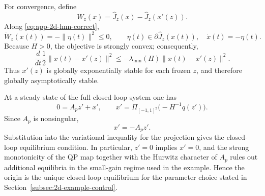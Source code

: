 \documentclass[journal]{IEEEtran}
\theoremstyle{myplain}
\begin{document}
For convergence, define
\[
  W_z(x)=\widehat J_z(x)-\widehat J_z(x'(z)).
\]
Along \eqref{eq:app-2d-hnn-correct},
\[
  \dot W_z(x(t))=-\|\eta(t)\|^2\le 0,
  \qquad
  \eta(t)\in\partial\widehat J_z(x(t)),\quad
  \dot x(t)=-\eta(t).
\]
Because \(H>0\), the objective is strongly convex; consequently,
\[
  \frac{d}{dt}\frac12\|x(t)-x'(z)\|^2
  \le
  -\lambda_{\min}(H)\|x(t)-x'(z)\|^2 .
\]
Thus \(x'(z)\) is globally exponentially stable for each frozen \(z\), and
therefore globally asymptotically stable.

At a steady state of the full closed-loop system one has
\[
  0=A_pz'+x',
  \qquad
  x'=\Pi_{[-1,1]^2}\bigl(-H^{-1}q(z')\bigr).
\]
Since \(A_p\) is nonsingular,
\[
  x'=-A_pz'.
\]
Substitution into the variational inequality for the projection gives the
closed-loop equilibrium condition. In particular, \(z'=0\) implies \(x'=0\),
and the strong monotonicity of the QP map together with the Hurwitz character
of \(A_p\) rules out additional equilibria in the small-gain regime used in the
example. Hence the origin is the unique closed-loop equilibrium for the
parameter choice stated in Section~\ref{subsec:2d-example-control}.
\end{document}
